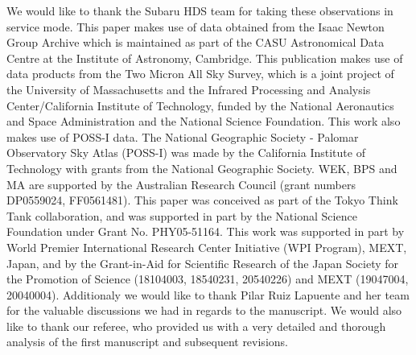 \bigskip
We would like to thank the Subaru HDS team for taking these
observations in service mode. This paper makes use of data obtained
from the Isaac Newton Group Archive which is maintained as part of the
CASU Astronomical Data Centre at the Institute of Astronomy,
Cambridge. This publication makes use of data products from the Two
Micron All Sky Survey, which is a joint project of the University of
Massachusetts and the Infrared Processing and Analysis
Center/California Institute of Technology, funded by the National
Aeronautics and Space Administration and the National Science
Foundation. This work also makes use of POSS-I data. The National Geographic Society - Palomar Observatory Sky Atlas (POSS-I) was made by the California Institute of Technology with grants from the National Geographic Society. 
WEK, BPS and MA are supported by the Australian Research
Council (grant numbers DP0559024, FF0561481). This paper was conceived as part of the Tokyo Think Tank
collaboration, and was supported in part by the National Science
Foundation under Grant No. PHY05-51164.
This work was supported in part by World Premier International
Research Center Initiative (WPI Program), MEXT, Japan, and by the
Grant-in-Aid for Scientific Research of the Japan Society for the
Promotion of Science (18104003, 18540231, 20540226) and MEXT (19047004, 20040004). 
Additionaly we would like to thank Pilar Ruiz Lapuente and her team for the valuable discussions we had in regards to the manuscript. We would also like to thank our referee, who provided us with a very detailed and thorough analysis of the first manuscript and subsequent revisions. 
